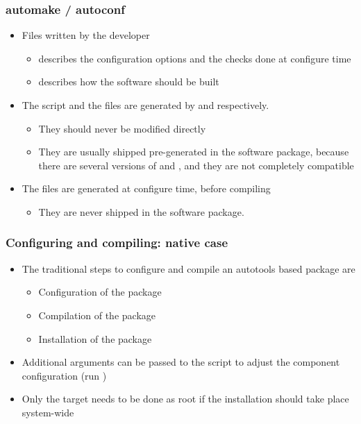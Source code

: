 \begin{frame}
  \frametitle{automake / autoconf}
  \begin{itemize}
  \item Files written by the developer
    \begin{itemize}
    \item {} describes the configuration options and
      the checks done at configure time
    \item {} describes how the software should be
      built
    \end{itemize}
  \item The  script and the  files
    are generated by  and  respectively.
    \begin{itemize}
    \item They should never be modified directly
    \item They are usually shipped pre-generated in the software
      package, because there are several versions of 
      and , and they are not completely compatible
    \end{itemize}
  \item The  files are generated at configure time, before
    compiling
    \begin{itemize}
    \item They are never shipped in the software package.
    \end{itemize}
  \end{itemize}
\end{frame}

\begin{frame}
  \frametitle{Configuring and compiling: native case}
  \begin{itemize}
  \item The traditional steps to configure and compile an autotools
    based package are
    \begin{itemize}
    \item Configuration of the package\\
    \item Compilation of the package\\
    \item Installation of the package\\
    \end{itemize}
  \item Additional arguments can be passed to the 
    script to adjust the component configuration
    (run )
  \item Only the  target needs to be done as root if the
    installation should take place system-wide
  \end{itemize}
\end{frame}

